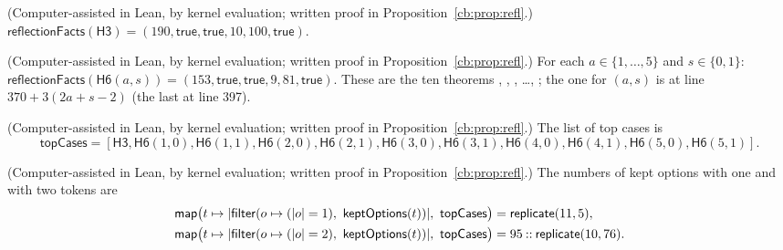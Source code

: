 \begin{fact}\label{cb:fact:refl-h3}
(Computer-assisted in Lean, by kernel evaluation; written proof in Proposition~\ref{cb:prop:refl}.)
$\mathsf{reflectionFacts}(\mathsf{H3})=(190,\mathsf{true},\mathsf{true},10,100,\mathsf{true})$.
\end{fact}

\begin{fact}\label{cb:fact:refl-h6}
(Computer-assisted in Lean, by kernel evaluation; written proof in Proposition~\ref{cb:prop:refl}.)
For each $a\in\{1,\dots,5\}$ and $s\in\{0,1\}$:
$\mathsf{reflectionFacts}(\mathsf{H6}(a,s))=(153,\mathsf{true},\mathsf{true},9,81,\mathsf{true})$. These are the ten
theorems , , , \dots,
; the one for $(a,s)$ is at line $370+3(2a+s-2)$ (the last at line 397).
\end{fact}

\begin{fact}\label{cb:fact:topcases}
(Computer-assisted in Lean, by kernel evaluation; written proof in Proposition~\ref{cb:prop:refl}.)
The list of top cases is
\[
\mathsf{topCases}=[\mathsf{H3},\mathsf{H6}(1,0),\mathsf{H6}(1,1),\mathsf{H6}(2,0),\mathsf{H6}(2,1),\mathsf{H6}(3,0),
\mathsf{H6}(3,1),\mathsf{H6}(4,0),\mathsf{H6}(4,1),\mathsf{H6}(5,0),\mathsf{H6}(5,1)].
\]
\end{fact}

\begin{fact}\label{cb:fact:strata}
(Computer-assisted in Lean, by kernel evaluation; written proof in Proposition~\ref{cb:prop:refl}.)
The numbers of kept options with one and with two tokens are
\begin{align*}
\mathsf{map}\big(t\mapsto\card{\mathsf{filter}(o\mapsto(\card o=1),\ \mathsf{keptOptions}(t))},\
\mathsf{topCases}\big)&=\mathsf{replicate}(11,5),\\
\mathsf{map}\big(t\mapsto\card{\mathsf{filter}(o\mapsto(\card o=2),\ \mathsf{keptOptions}(t))},\
\mathsf{topCases}\big)&=95\mathbin{::}\mathsf{replicate}(10,76).
\end{align*}
\end{fact}

